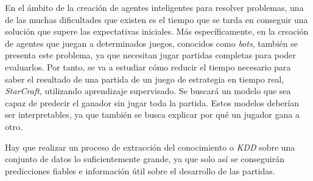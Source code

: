 
En el ámbito de la creación de agentes inteligentes para resolver problemas,
una de las muchas dificultades que existen es el tiempo que se tarda en conseguir
una solución que supere las expectativas iniciales. Más específicamente,
en la creación de agentes que juegan a determinados juegos, conocidos como
\emph{bots}, también se presenta este problema, ya que necesitan jugar
partidas completas para poder evaluarlos. Por tanto, se va a estudiar cómo
reducir el tiempo necesario para saber el resultado de una partida de un
juego de estrategia en tiempo real, \emph{StarCraft}, utilizando aprendizaje
supervisado. Se buscará un modelo que sea capaz de predecir el ganador sin jugar
toda la partida. Estos modelos deberían ser interpretables, ya que
también se busca explicar por qué un jugador gana a otro.


Hay que realizar un proceso de extracción del
conocimiento o \emph{KDD} sobre una conjunto de datos lo suficientemente
grande, ya que solo así se conseguirán predicciones fiables e información útil
sobre el desarrollo de las partidas.

